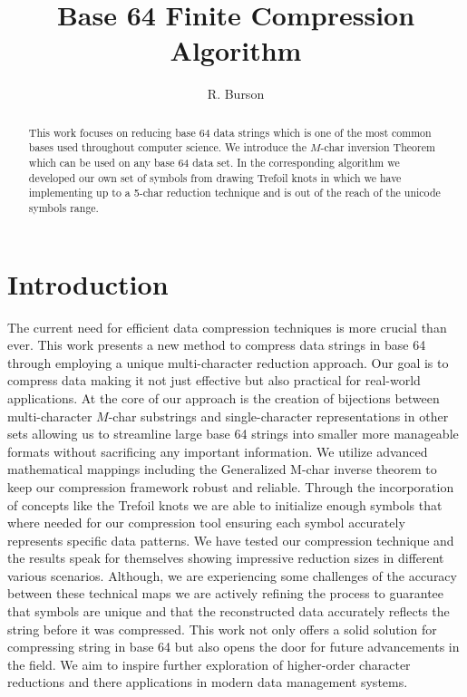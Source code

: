\documentclass[amsmath,12pt,a4paper]{amsart}
\title[Base 64 Finite Compression Algorithm] {Base 64 Finite Compression Algorithm}
\author{R. Burson}
\begin{document}
\maketitle
\begin{abstract}
This work focuses on reducing base 64 data strings which is one of the most common bases used throughout computer science. We introduce the $M$-char inversion Theorem which can be used on any base 64 data set. In the corresponding algorithm we developed our own set of symbols from drawing Trefoil knots in which we have implementing up to a 5-char reduction technique and is out of the reach of the unicode symbols range.
\end{abstract}


\section{Introduction}\label{Sec1}

 The current need for efficient data compression techniques is more crucial than ever. This work presents a new method to compress data strings in base 64 through employing a unique multi-character reduction approach. Our goal is to compress data making it not just effective but also practical for real-world applications. At the core of our approach is the creation of bijections between multi-character $M$-char substrings and single-character representations in other sets allowing us to streamline large base 64 strings into smaller more manageable formats without sacrificing any important information. We utilize advanced mathematical mappings including the Generalized M-char inverse theorem to keep our compression framework robust and reliable. Through the incorporation of concepts like the Trefoil knots we are able to initialize enough symbols that where needed for our compression tool ensuring each symbol accurately represents specific data patterns. We have tested our compression technique and the results speak for themselves showing impressive reduction sizes in different various scenarios. Although, we are experiencing some challenges of the accuracy between these technical maps we are actively refining the process to guarantee that symbols are unique and that the reconstructed data accurately reflects the string before it was compressed. This work not only offers a solid solution for compressing string in base 64 but also opens the door for future advancements in the field. We aim to inspire further exploration of higher-order character reductions and there applications in modern data management systems.
 
\end{document}
